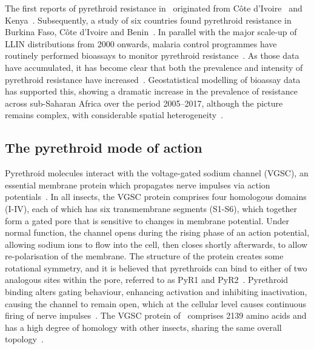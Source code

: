 \begin{refsection}
The first reports of pyrethroid resistance in \agam\ originated from  C\^ote d'Ivoire~\parencite{Elissa1993} and Kenya~\parencite{Vulule1994}.
%
Subsequently, a study of six countries found pyrethroid resistance in Burkina Faso, C\^ote d'Ivoire and Benin~\parencite{Chandre1999}.
%
In parallel with the major scale-up of LLIN distributions from 2000 onwards, malaria control programmes have routinely performed bioassays to monitor pyrethroid resistance~\parencite{WHO2018TPIRM,WHO2017FNPMMIR}.
%
As those data have accumulated, it has become clear that both the prevalence and intensity of pyrethroid resistance have increased~\parencite{Ranson2011,Hemingway2016,WHO2012GPIRM,WHO2018GRIR,IIRC2018}.
%
Geostatistical modelling of bioassay data has supported this, showing a dramatic increase in the prevalence of resistance across sub-Saharan Africa over the period 2005--2017, although the picture remains complex, with considerable spatial heterogeneity~\parencite{Hancock2020}.


\subsection{The pyrethroid mode of action}\label{subsec:intro-moa}


Pyrethroid molecules interact with the voltage-gated sodium channel (VGSC), an essential membrane protein which propagates nerve impulses via action potentials~\parencite{Dong2014}.
%
In all insects, the VGSC protein comprises four homologous domains (I-IV), each of which has six transmembrane segments (S1-S6), which together form a gated pore that is sensitive to changes in membrane potential.
%
Under normal function, the channel opens during the rising phase of an action potential, allowing sodium ions to flow into the cell, then closes shortly afterwards, to allow re-polarisation of the membrane.
%
The structure of the protein creates some rotational symmetry, and it is believed that pyrethroids can bind to either of two analogous sites within the pore, referred to as PyR1 and PyR2~\parencite{Du2013}.
%
Pyrethroid binding alters gating behaviour, enhancing activation and inhibiting inactivation, causing the channel to remain open, which at the cellular level causes continuous firing of nerve impulses~\parencite{Dong2014}.
%
The VGSC protein of \agam\ comprises 2139 amino acids and has a high degree of homology with other insects, sharing the same overall topology~\parencite{Davies2007}.



\end{refsection}
